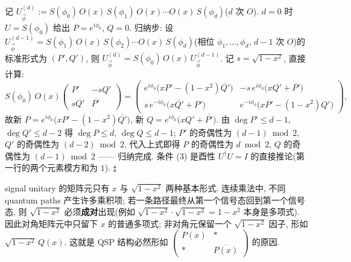 \documentclass[utf8]{article} %
\numberwithin{equation}{section}   %
\newtheorem{Note}{\hskip 2em {\color{red} 注}}[subsection]
\newenvironment{Proof}{{\noindent\it Proof:}\quad}{\hfill $\sharp $\par}
\begin{document}
\begin{Proof}[表示的正方向(归纳)]
    记 $U_{\vec\phi}^{(d)} := S(\phi_0)\,O(x)\,S(\phi_1)\,O(x)\cdots O(x)\,S(\phi_d)$($d$ 次 $O$).
    $d = 0$ 时 $U = S(\phi_0)$ 给出 $P = e^{i\phi_0}$, $Q = 0$. 归纳步: 设
    $U_{\vec\phi}^{(d-1)} = S(\phi_1)\,O(x)\,S(\phi_2)\cdots O(x)\,S(\phi_d)$(相位
    $\phi_1,\dots,\phi_d$, $d-1$ 次 $O$)的标准形式为 $(P', Q')$, 则
    $U_{\vec\phi}^{(d)} = S(\phi_0)\,O(x)\,U_{\vec\phi}^{(d-1)}$. 记 $s = \sqrt{1-x^2}$,
    直接计算:
    \begin{equation}
        S(\phi_0)\,O(x)\begin{pmatrix} P' & -sQ' \\ s\overline{Q'} & \overline{P'} \end{pmatrix}
        = \begin{pmatrix}
            e^{i\phi_0}\big(xP' - (1-x^2)\overline{Q'}\big) & -s\,e^{i\phi_0}\big(xQ' + \overline{P'}\big) \\
            s\,e^{-i\phi_0}\big(x\overline{Q'} + P'\big) & e^{-i\phi_0}\big(x\overline{P'} - (1-x^2)Q'\big)
        \end{pmatrix},
    \end{equation}
    故新 $P = e^{i\phi_0}\big(xP' - (1-x^2)\overline{Q'}\big)$,
    新 $Q = e^{i\phi_0}\big(xQ' + \overline{P'}\big)$.
    由 $\deg P' \le d-1$, $\deg Q' \le d-2$ 得 $\deg P \le d$, $\deg Q \le d-1$;
    $P'$ 的奇偶性为 $(d-1)\bmod 2$, $Q'$ 的奇偶性为 $(d-2)\bmod 2$, 代入上式即得
    $P$ 的奇偶性为 $d\bmod 2$, $Q$ 的奇偶性为 $(d-1)\bmod 2$ —— 归纳完成.
    条件 (3) 是酉性 $U^\dagger U = I$ 的直接推论(第一行的两个元素模方和为 $1$).
\end{Proof}

\begin{Note}[为什么最后一定是多项式]
    signal unitary 的矩阵元只有 $x$ 与 $\sqrt{1-x^2}$ 两种基本形式. 连续乘法中, 不同
    quantum paths 产生许多乘积项; 若一条路径最终从第一个信号态回到第一个信号态, 则
    $\sqrt{1-x^2}$ 必须\textbf{成对}出现(例如 $\sqrt{1-x^2}\cdot\sqrt{1-x^2} = 1-x^2$
    本身是多项式). 因此对角矩阵元中只留下 $x$ 的普通多项式; 非对角元保留一个
    $\sqrt{1-x^2}$ 因子, 形如 $\sqrt{1-x^2}\,Q(x)$. 这就是 QSP 结构必然形如
    $\begin{pmatrix} P(x) & \ast \\ \ast & \overline{P(x)} \end{pmatrix}$ 的原因.
\end{Note}
\end{document}
